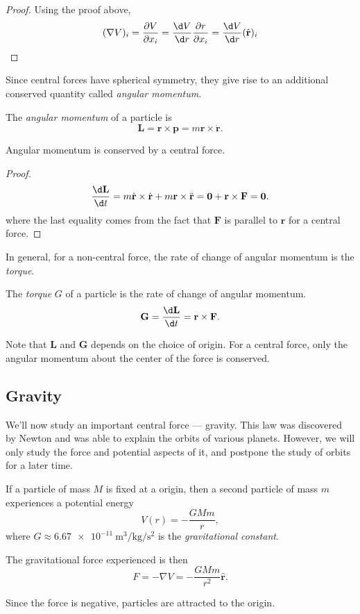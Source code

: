 \documentclass[a4paper]{article}
\begin{document}
\begin{proof}
  Using the proof above,
  \[
    (\nabla V)_i = \frac{\partial V}{\partial x_i} = \frac{\d V}{\d r} \frac{\partial r}{\partial x_i} = \frac{\d V}{\d r}(\hat{\mathbf{r}})_i\qedhere
  \]
\end{proof}
Since central forces have spherical symmetry, they give rise to an additional conserved quantity called \emph{angular momentum}.

\begin{defi}
  The \emph{angular momentum} of a particle is
  \[
    \mathbf{L} = \mathbf{r}\times \mathbf{p} = m\mathbf{r}\times \dot{\mathbf{r}}.
  \]
\end{defi}

\begin{prop}
  Angular momentum is conserved by a central force.
\end{prop}

\begin{proof}
  \[
    \frac{\d \mathbf{L}}{\d t} = m\dot{\mathbf{r}} \times \dot{\mathbf{r}} + m\mathbf{r}\times \ddot{\mathbf{r}} = \mathbf{0} + \mathbf{r}\times \mathbf{F} = \mathbf{0}.
  \]
  where the last equality comes from the fact that $\mathbf{F}$ is parallel to $\mathbf{r}$ for a central force.
\end{proof}
In general, for a non-central force, the rate of change of angular momentum is the \emph{torque}.
\begin{defi}[Torque]
  The \emph{torque} $G$ of a particle is the rate of change of angular momentum.
  \[
    \mathbf{G} = \frac{\d \mathbf{L}}{\d t} = \mathbf{r}\times \mathbf{F}.
  \]
\end{defi}

Note that $\mathbf{L}$ and $\mathbf{G}$ depends on the choice of origin. For a central force, only the angular momentum about the center of the force is conserved.

\subsection{Gravity}
We'll now study an important central force --- gravity. This law was discovered by Newton and was able to explain the orbits of various planets. However, we will only study the force and potential aspects of it, and postpone the study of orbits for a later time.

\begin{law}
  If a particle of mass $M$ is fixed at a origin, then a second particle of mass $m$ experiences a potential energy
  \[
    V(r) = -\frac{GMm}{r},
  \]
  where $G \approx \SI{6.67e-11}{\meter\cubed\per\kilogram\per\second\squared}$ is the \emph{gravitational constant}.

  The gravitational force experienced is then
  \[
    F = -\nabla V = -\frac{GMm}{r^2}\hat{\mathbf{r}}.
  \]
\end{law}
Since the force is negative, particles are attracted to the origin.
\end{document}
